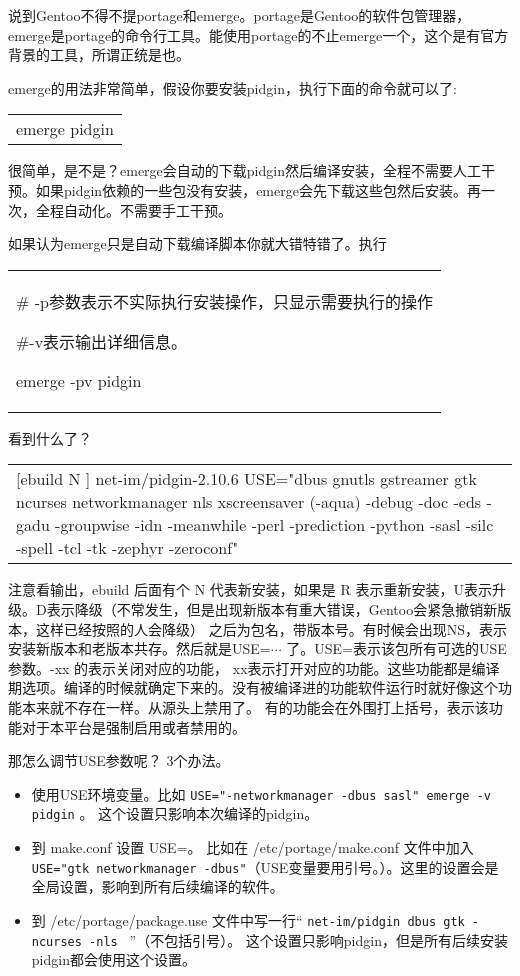\documentclass[amstex,twoside]{ctexbook}
\newenvironment{code}{\small\tt\begin{longtable}{p{0.8\textwidth}}}{\end{longtable}}
\begin{document}
说到Gentoo不得不提portage和emerge。portage是Gentoo的软件包管理器，emerge是portage的命令行工具。能使用portage的不止emerge一个，这个是有官方背景的工具，所谓正统是也。

emerge的用法非常简单，假设你要安装pidgin，执行下面的命令就可以了:
\begin{code}
emerge pidgin
\end{code}

很简单，是不是？emerge会自动的下载pidgin然后编译安装，全程不需要人工干预。如果pidgin依赖的一些包没有安装，emerge会先下载这些包然后安装。再一次，全程自动化。不需要手工干预。

如果认为emerge只是自动下载编译脚本你就大错特错了。执行
\begin{code}
\# -p参数表示不实际执行安装操作，只显示需要执行的操作

\#-v表示输出详细信息。

emerge -pv pidgin
\end{code}

看到什么了？

\begin{code}
[ebuild   N    ] net-im/pidgin-2.10.6 USE="dbus gnutls gstreamer gtk ncurses networkmanager nls xscreensaver (-aqua) -debug -doc -eds -gadu -groupwise -idn -meanwhile -perl -prediction -python -sasl -silc -spell -tcl -tk -zephyr -zeroconf"
\end{code}

注意看输出，ebuild 后面有个 N 代表新安装，如果是 R 表示重新安装，U表示升级。D表示降级（不常发生，但是出现新版本有重大错误，Gentoo会紧急撤销新版本，这样已经按照的人会降级）
之后为包名，带版本号。有时候会出现NS，表示安装新版本和老版本共存。然后就是USE=$\cdots$ 了。USE=表示该包所有可选的USE参数。-xx 的表示关闭对应的功能， xx表示打开对应的功能。这些功能都是编译期选项。编译的时候就确定下来的。没有被编译进的功能软件运行时就好像这个功能本来就不存在一样。从源头上禁用了。
有的功能会在外围打上括号，表示该功能对于本平台是强制启用或者禁用的。

那怎么调节USE参数呢？ 3个办法。

\begin{itemize}
\item 使用USE环境变量。比如{ \tt  USE="-networkmanager -dbus sasl" emerge -v pidgin} 。 这个设置只影响本次编译的pidgin。
\item 到 make.conf 设置 USE=。 比如在 /etc/portage/make.conf 文件中加入 {\tt USE="gtk networkmanager -dbus"}（USE变量要用引号。）。这里的设置会是全局设置，影响到所有后续编译的软件。
\item 到 /etc/portage/package.use 文件中写一行“ { \tt  net-im/pidgin dbus gtk -ncurses -nls } ”（不包括引号）。 这个设置只影响pidgin，但是所有后续安装pidgin都会使用这个设置。
\end{itemize}
\end{document}
